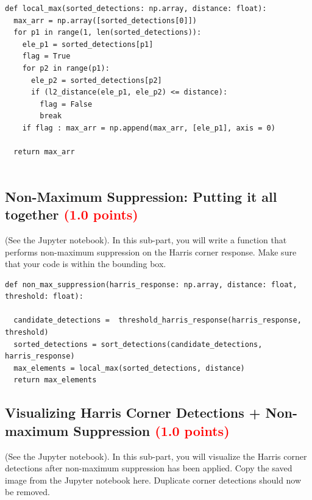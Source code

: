\documentclass[answers]{exam}
\newcommand{\mypoints}[1]{\textcolor{red}{(#1 points)}}
\begin{document}
\begin{solution}
\begin{verbatim}
def local_max(sorted_detections: np.array, distance: float):
  max_arr = np.array([sorted_detections[0]])
  for p1 in range(1, len(sorted_detections)):
    ele_p1 = sorted_detections[p1]
    flag = True
    for p2 in range(p1):
      ele_p2 = sorted_detections[p2]
      if (l2_distance(ele_p1, ele_p2) <= distance): 
        flag = False
        break
    if flag : max_arr = np.append(max_arr, [ele_p1], axis = 0)

  return max_arr
  
\end{verbatim}
\end{solution}

\subsection{Non-Maximum Suppression: Putting it all together \mypoints{1.0}}
(See the Jupyter notebook). In this sub-part, you will write a function that performs non-maximum suppression on the Harris corner response. Make sure that your code is within the bounding box.

\begin{solution}
\begin{verbatim}
def non_max_suppression(harris_response: np.array, distance: float, threshold: float):

  candidate_detections =  threshold_harris_response(harris_response, threshold)
  sorted_detections = sort_detections(candidate_detections, harris_response)
  max_elements = local_max(sorted_detections, distance)
  return max_elements
\end{verbatim}
\end{solution}


\subsection{Visualizing Harris Corner Detections + Non-maximum Suppression \mypoints{1.0}}
(See the Jupyter notebook). In this sub-part, you will visualize the Harris corner detections after non-maximum suppression has been applied. Copy the saved image from the Jupyter notebook here. Duplicate corner detections should now be removed.
\end{document}

